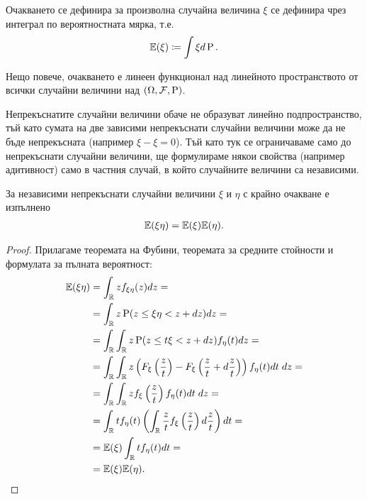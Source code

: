 \documentclass[numbers=endperiod, bibliography=totocnumbered]{scrartcl}
\begin{document}
\begin{note}
  Очакването се дефинира за произволна случайна величина \( \xi \) се дефинира чрез интеграл по вероятностната мярка, т.е.
  \begin{align*}
    \mathbb{E}(\xi) \coloneqq \int \xi d\operatorname{P}.
  \end{align*}

  Нещо повече, очакването е линеен функционал над линейното пространството от всички случайни величини над \( (\Omega, \mathcal{F}, \operatorname{P}) \).

  Непрекъснатите случайни величини обаче не образуват линейно подпространство, тъй като сумата на две зависими непрекъснати случайни величини може да не бъде непрекъсната (например \( \xi - \xi = 0 \)). Тъй като тук се ограничаваме само до непрекъснати случайни величини, ще формулираме някои свойства (например адитивност) само в частния случай, в който случайните величини са независими.
\end{note}

\begin{proposition}\label{thm:expectation_of_independent_product}
  За независими непрекъснати случайни величини \( \xi \) и \( \eta \) с крайно очакване е изпълнено
  \begin{align*}
    \mathbb{E}(\xi \eta) = \mathbb{E}(\xi) \mathbb{E}(\eta).
  \end{align*}
\end{proposition}
\begin{proof}
  Прилагаме теоремата на Фубини, теоремата за средните стойности и формулата за пълната вероятност:
  \begin{align*}
    \mathbb{E}(\xi \eta)
    &=
    \int_{\mathbb{R}} z f_{\xi \eta}(z) dz
    = \\ &=
    \int_{\mathbb{R}} z \operatorname{P}(z \leq \xi \eta < z + dz) dz
    = \\ &=
    \int_{\mathbb{R}} \int_{\mathbb{R}} z \operatorname{P}(z \leq t \xi < z + dz) f_\eta(t) dz
    = \\ &=
    \int_{\mathbb{R}} \int_{\mathbb{R}} z \left( F_\xi\left(\frac z t \right) - F_\xi\left(\frac z t + d\frac z t \right) \right) f_\eta(t) dt \; dz
    = \\ &=
    \int_{\mathbb{R}} \int_{\mathbb{R}} z f_\xi \left(\frac z t \right) f_\eta(t) dt \; dz
    = \\ &=
    \int_{\mathbb{R}} t f_\eta(t) \left(\int_{\mathbb{R}} \frac z t f_\xi \left(\frac z t \right) d\frac z t \right) dt
    = \\ &=
    \mathbb{E}(\xi) \int_{\mathbb{R}} t f_\eta(t) dt
    = \\ &=
    \mathbb{E}(\xi) \mathbb{E}(\eta).
  \end{align*}
\end{proof}
\end{document}
